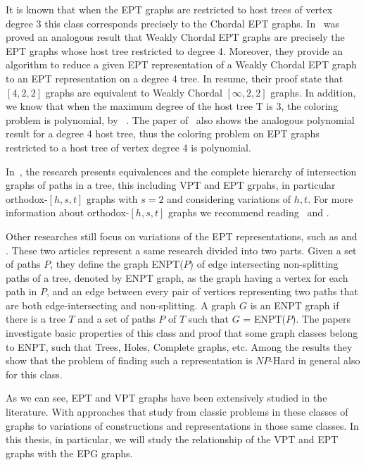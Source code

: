  It is known that when the EPT graphs are restricted to host trees of vertex degree 3 this class corresponds precisely to the Chordal EPT graphs. In~\citet{golumbic2008representing} was  proved an analogous result that Weakly Chordal EPT graphs are precisely the EPT graphs whose host tree restricted to degree 4. Moreover, they provide an algorithm to reduce a given EPT representation of a Weakly Chordal EPT graph to an EPT representation on a degree 4 tree. In resume, their proof state that  $[4, 2, 2]$ graphs are equivalent to Weakly Chordal $[\infty, 2, 2]$ graphs. In addition, we know that when the maximum degree of the host tree T is 3, the coloring problem is polynomial, by
~\cite{golumbic1985}. The paper of~\cite{golumbic2008representing} also shows the analogous polynomial result for a degree 4 host tree, thus the coloring problem on EPT graphs restricted to a host tree of vertex degree 4 is polynomial.

In~\citet{golumbic2008equivalences}, the research presents equivalences and the complete hierarchy of intersection graphs of paths in a tree, this including VPT and EPT grpahs, in particular orthodox-$[h,s,t]$ graphs with $s=2$ and considering variations of $h,t$. For more information about orthodox-$[h,s,t]$ graphs we recommend reading~\citet{jamison2005constant} and \citet{jose2018}.

Other researches still focus on variations of the EPT representations, such as \cite{boyaci2013graphs} and \cite{boyaci2016graphs}. These two articles represent a same research divided into two parts. Given a set of paths $P$, they define the graph ENPT($P$) of edge intersecting non-splitting paths of a tree, denoted by ENPT graph, as the graph having a vertex for each path in $P$, and an edge between every pair of vertices representing two paths that are both edge-intersecting and non-splitting. A graph $G$ is an ENPT graph if there is a tree $T$ and a set of paths $P$ of $T$ such that $G$ = ENPT($P$). The papers investigate basic properties of this class and proof that some graph classes belong to ENPT, such that Trees, Holes, Complete graphs, etc. Among the results they show that the problem of finding such a representation is $NP$-Hard in general also for this class.

As we can see, EPT and VPT graphs have been extensively studied in the literature. With approaches that study from classic problems in these classes of graphs to variations of constructions and representations in those same classes. In this thesis, in particular, we will study the relationship of the VPT and EPT graphs with the EPG graphs.

